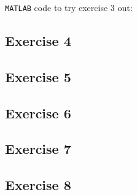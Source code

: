 \bigskip

\texttt{MATLAB} code to try exercise 3 out:



\subsection*{Exercise 4}
\subsection*{Exercise 5}
\subsection*{Exercise 6}
\subsection*{Exercise 7}
\subsection*{Exercise 8}